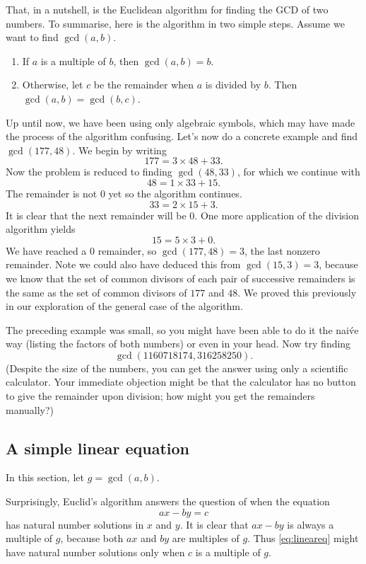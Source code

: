 \documentclass[a4paper,10pt]{article}
\begin{document}
That, in a nutshell, is the Euclidean algorithm for finding the GCD of two numbers. To summarise, here is the
algorithm in two simple steps. Assume we want to find $\gcd(a,b)$.
\begin{enumerate}
\item If $a$ is a multiple of $b$, then $\gcd(a,b)=b$.
\item Otherwise, let $c$ be the remainder when $a$ is divided by $b$. Then $\gcd(a,b)=\gcd(b,c)$.
\end{enumerate}

Up until now, we have been using only algebraic symbols, which may have made the process of the algorithm
confusing. Let's now do a concrete example and find $\gcd(177,48)$. We begin by writing
\[177=3\times48+33.\]
Now the problem is reduced to finding $\gcd(48,33)$, for which we continue with
\[48=1\times33+15.\]
The remainder is not $0$ yet so the algorithm continues.
\[33=2\times15+3.\]
It is clear that the next remainder will be $0$. One more application
of the division algorithm yields
\[15=5\times3+0.\]
We have reached a $0$ remainder, so $\gcd(177,48)=3$, the last nonzero remainder. Note we could
also have deduced this from $\gcd(15,3)=3$, 
because we know that the set of common divisors of each pair
of successive remainders is the same as the set of common
divisors of $177$ and $48$. We proved this previously in
our exploration of the general case of the algorithm.

The preceding example was small, so you might have been able to do it the nai\'ve way (listing
the factors of both numbers) or even in your head. Now try finding \[\gcd(1160718174,316258250).\]
(Despite the size of the numbers, you can get the answer using only a scientific calculator. Your
immediate objection might be that the calculator has no button to give the remainder upon division;
how might you get the remainders manually?)

\subsection*{A simple linear equation}

In this section, let $g=\gcd(a,b).$

Surprisingly, Euclid's algorithm answers the question of when the equation
\begin{equation}ax-by=c\label{eq:lineareq}\end{equation} has natural number solutions in $x$ and $y$. It is clear that $ax-by$
is always a multiple of $g$, because both $ax$ and $by$ are multiples of $g$.
Thus \eqref{eq:lineareq} might have natural number solutions only when $c$ is a multiple of $g$.
\end{document}
